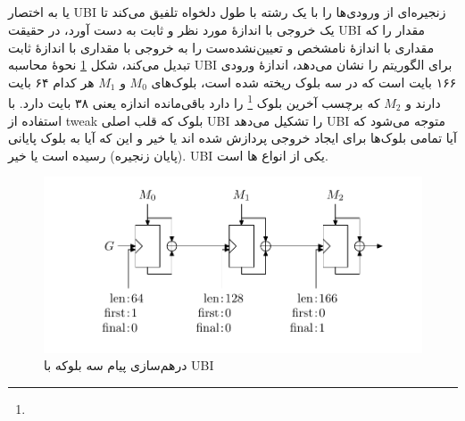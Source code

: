 \subsection{}
یا به اختصار 
UBI
زنجیره‌ای از ورودی‌ها را با یک رشته با طول دلخواه تلفیق می‌کند تا یک خروجی با اندازهٔ مورد نظر و ثابت به دست آورد، در حقیقت 
UBI
مقدار 
را که مقداری با اندازهٔ نامشخص و تعیین‌نشده‌ست را به خروجی با مقداری با اندازهٔ ثابت تبدیل می‌کند، شکل 
\ref{three_block_message}
نحوهٔ محاسبه 
UBI
برای الگوریتم 
را نشان می‌دهد، اندازهٔ ورودی ۱۶۶ بایت است که در سه بلوک ریخته شده است، بلوک‌های 
$M_0$
و 
$M_1$
هر کدام ۶۴ بایت دارند و 
$M_2$ 
که برچسب آخرین بلوک
\footnote{}
را دارد باقی‌مانده اندازه یعنی ۳۸ بایت دارد. با استفاده از 
tweak
بلوک که قلب اصلی 
UBI
را تشکیل می‌دهد
UBI 
متوجه می‌شود که آیا تمامی بلوک‌ها برای ایجاد خروجی پردازش شده اند یا خیر و این که آیا به بلوک پایانی (پایان زنجیره) رسیده است یا خیر. 
UBI 
یکی از انواع 
ها است.
\cite{matyas}
\begin{figure}
\centering
\includegraphics[width=\textwidth]{figs/three_block_message.png}
\caption{درهم‌سازی پیام سه بلوکه  با UBI}
\label{three_block_message}
\end{figure}

